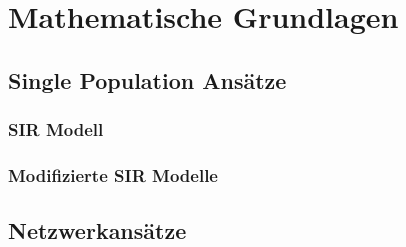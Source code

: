 \section{Mathematische Grundlagen}
\subsection{Single Population Ansätze}
\subsubsection{SIR Modell}
\subsubsection{Modifizierte SIR Modelle}
\subsection{Netzwerkansätze}